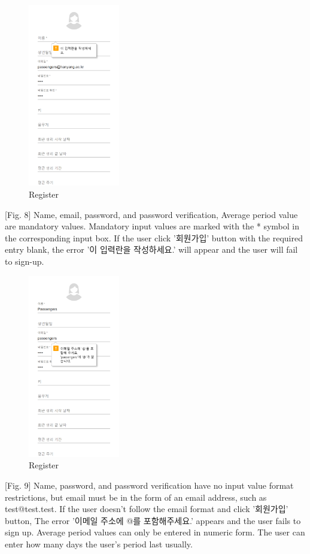 \documentclass[conference]{IEEEtran}
\begin{document}
\begin{itemize}
    \begin{figure}[htbp]
    \includegraphics[width=4cm, height=8cm, center]{register2.png}
    \caption{Register}
    \label{fig8}
    \end{figure}
    
    [Fig. 8] Name, email, password, and password verification, Average period value are mandatory values. Mandatory input values are marked with the * symbol in the corresponding input box. If the user click '회원가입' button with the required entry blank, the error '이 입력란을 작성하세요.' will appear and the user will fail to sign-up.
    
    \begin{figure}[htbp]
    \includegraphics[width=4cm, height=8cm, center]{register3.png}
    \caption{Register}
    \label{fig9}
    \end{figure}
    
    [Fig. 9] Name, password, and password verification have no input value format restrictions, but email must be in the form of an email address, such as test@test.test. If the user doesn't follow the email format and click '회원가입' button,  The error '이메일 주소에 @를 포함해주세요.' appears and the user fails to sign up.
    Average period values can only be entered in numeric form. The user can enter how many days the user's period last usually.
    

\end{itemize}
\end{document}
